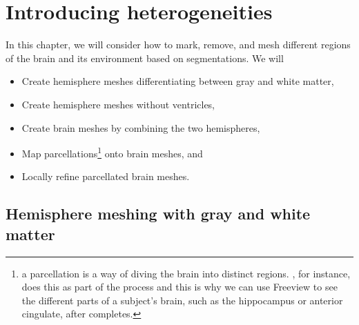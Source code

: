\chapter{Introducing heterogeneities}
\label{chp:chp4}

In this chapter, we will consider how to mark, remove, and mesh
different regions of the brain and its environment based on
{\freesurfer} segmentations. We will
\begin{itemize}
\item
  Create hemisphere meshes differentiating between gray and white matter,
\item
  Create hemisphere meshes without ventricles,
\item
  Create brain meshes by combining the two hemispheres,
\item
  Map parcellations\footnote{a parcellation is a way of diving the brain 
  into distinct regions.  {\freesurfer}, for instance, does this as part of 
  the  process and this is why we can use Freeview to see the 
  different parts of a subject's brain, such as the hippocampus or anterior 
  cingulate, after  completes.} 
  onto brain meshes, and
\item
  Locally refine parcellated brain meshes.
\end{itemize}

\section{Hemisphere meshing with gray and white matter}
\label{sec:chp4:tools:gray-white}


